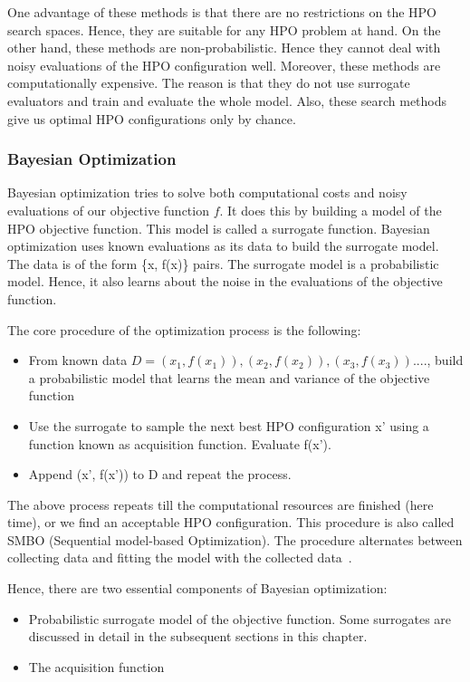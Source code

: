\documentclass[12pt, twoside, ngerman]{report}
\begin{document}
One advantage of these methods is that there are no restrictions on the HPO search spaces. Hence, they are suitable for any HPO problem at hand.
On the other hand, these methods are non-probabilistic.
Hence they cannot deal with noisy evaluations of the HPO configuration well.
Moreover, these methods are computationally expensive. The reason is that they do not use surrogate evaluators and train and evaluate the whole model.
Also, these search methods give us optimal HPO configurations only by chance.

\subsubsection{Bayesian Optimization}

Bayesian optimization tries to solve both computational costs and noisy evaluations of our objective function $f$.
It does this by building a model of the HPO objective function. This model is called a surrogate function.
Bayesian optimization uses known evaluations as its data to build the surrogate model. The data is of the form \{x, f(x)\} pairs.
The surrogate model is a probabilistic model. Hence, it also learns about the noise in the evaluations of the objective function.

The core procedure of the optimization process is the following:
\begin{itemize}
\item From known data $D = {(x_1, f(x_1)), (x_2, f(x_2)), (x_3, f(x_3)) .... }$, build a probabilistic model that learns the mean and variance of the objective function
\item Use the surrogate to sample the next best HPO configuration x' using a function known as acquisition function. Evaluate f(x').
\item Append (x', f(x')) to D and repeat the process.
\end{itemize}

The above process repeats till the computational resources are finished (here time), or we find an acceptable HPO configuration.
This procedure is also called SMBO (Sequential model-based Optimization).
The procedure alternates between collecting data and fitting the model with the 
collected data~\cite{SMBOPaper}.

Hence, there are two essential components of Bayesian optimization:

\begin{itemize}
\item Probabilistic surrogate model of the objective function. Some surrogates are discussed in detail in the subsequent sections in this chapter.
\item The acquisition function
\end{itemize}
\end{document}
